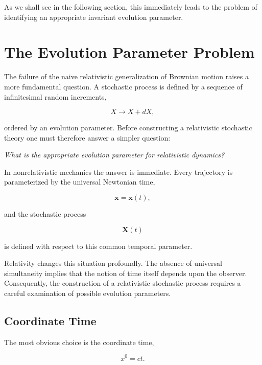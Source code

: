 As we shall see in the following section, this immediately leads to the
problem of identifying an appropriate invariant evolution parameter.



\section{The Evolution Parameter Problem}

The failure of the naive relativistic generalization of Brownian motion
raises a more fundamental question. A stochastic process is defined by a
sequence of infinitesimal random increments,

\[
X \longrightarrow X+dX,
\]

ordered by an evolution parameter. Before constructing a relativistic
stochastic theory one must therefore answer a simpler question:

\begin{center}
\emph{What is the appropriate evolution parameter for relativistic
dynamics?}
\end{center}

In nonrelativistic mechanics the answer is immediate. Every trajectory
is parameterized by the universal Newtonian time,

\[
\mathbf{x}=\mathbf{x}(t),
\]

and the stochastic process

\[
\mathbf{X}(t)
\]

is defined with respect to this common temporal parameter.

Relativity changes this situation profoundly. The absence of universal
simultaneity implies that the notion of time itself depends upon the
observer. Consequently, the construction of a relativistic stochastic
process requires a careful examination of possible evolution
parameters.

\subsection{Coordinate Time}

The most obvious choice is the coordinate time,

\[
x^0=ct.
\]

